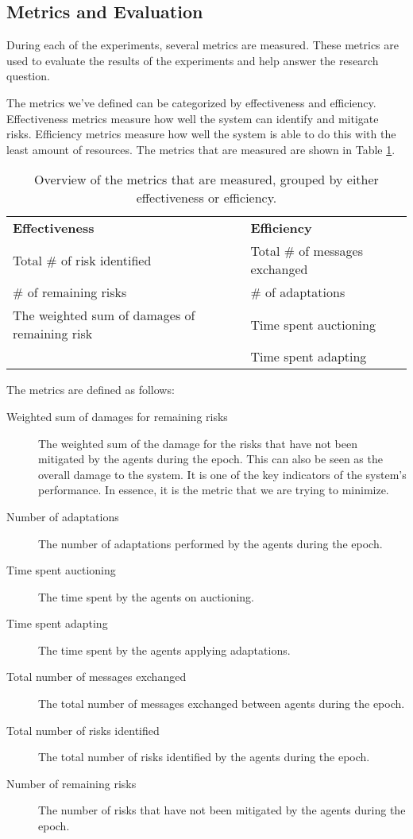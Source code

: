 \subsection{Metrics and Evaluation}
\label{ssec:metrics}
During each of the experiments, several metrics are measured. These metrics are used to evaluate the results of the experiments and help answer the research question. 

The metrics we've defined can be categorized by effectiveness and efficiency. Effectiveness metrics measure how well the system can identify and mitigate risks. Efficiency metrics measure how well the system is able to do this with the least amount of resources. The metrics that are measured are shown in Table \ref{table:metrics-groups}.

\begin{table}[H]
    \centering
    \begin{tabular}{l|l}
        \textbf{Effectiveness}            & \textbf{Efficiency}            \\
        Total \# of risk identified       & Total \# of messages exchanged \\
        \# of remaining risks             & \# of adaptations              \\
        The weighted sum of damages of remaining risk & Time spent auctioning  \\
                                          & Time spent adapting            \\
    \end{tabular}
    \caption{\label{table:metrics-groups}Overview of the metrics that are measured, grouped by either effectiveness or efficiency.}
\end{table}


The metrics are defined as follows:

\begin{description}
    \item[Weighted sum of damages for remaining risks] The weighted sum of the damage for the risks that have not been mitigated by the agents during the epoch. This can also be seen as the overall damage to the system. It is one of the key indicators of the system's performance. In essence, it is the metric that we are trying to minimize. 
    \item[Number of adaptations] The number of adaptations performed by the agents during the epoch.
    \item[Time spent auctioning] The time spent by the agents on auctioning.
    \item[Time spent adapting] The time spent by the agents applying adaptations.
    \item[Total number of messages exchanged] The total number of messages exchanged between agents during the epoch.
    \item[Total number of risks identified] The total number of risks identified by the agents during the epoch.
    \item[Number of remaining risks] The number of risks that have not been mitigated by the agents during the epoch.
\end{description}


